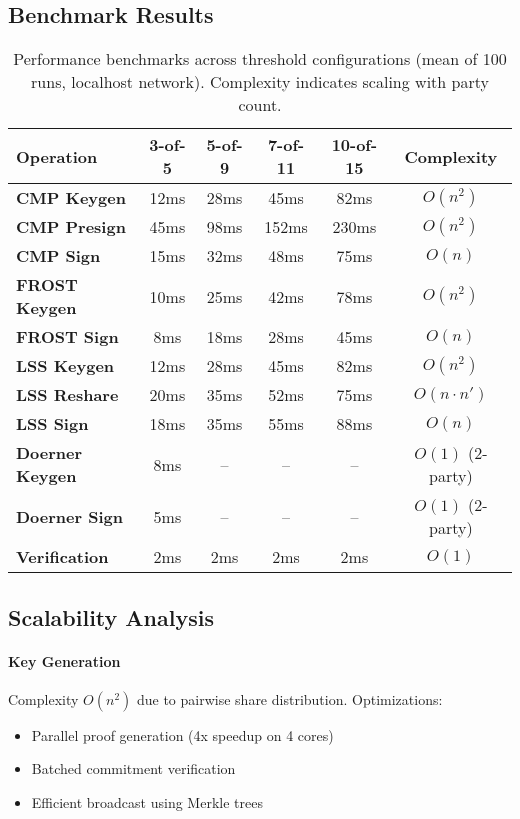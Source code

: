 \documentclass[11pt,twocolumn]{article}
\begin{document}
\subsection{Benchmark Results}

\begin{table*}[t]
\centering
\begin{tabular}{@{}lccccc@{}}
\toprule
\textbf{Operation} & \textbf{3-of-5} & \textbf{5-of-9} & \textbf{7-of-11} & \textbf{10-of-15} & \textbf{Complexity} \\
\midrule
\textbf{CMP Keygen} & 12ms & 28ms & 45ms & 82ms & $O(n^2)$ \\
\textbf{CMP Presign} & 45ms & 98ms & 152ms & 230ms & $O(n^2)$ \\
\textbf{CMP Sign} & 15ms & 32ms & 48ms & 75ms & $O(n)$ \\
\midrule
\textbf{FROST Keygen} & 10ms & 25ms & 42ms & 78ms & $O(n^2)$ \\
\textbf{FROST Sign} & 8ms & 18ms & 28ms & 45ms & $O(n)$ \\
\midrule
\textbf{LSS Keygen} & 12ms & 28ms & 45ms & 82ms & $O(n^2)$ \\
\textbf{LSS Reshare} & 20ms & 35ms & 52ms & 75ms & $O(n \cdot n')$ \\
\textbf{LSS Sign} & 18ms & 35ms & 55ms & 88ms & $O(n)$ \\
\midrule
\textbf{Doerner Keygen} & 8ms & -- & -- & -- & $O(1)$ (2-party) \\
\textbf{Doerner Sign} & 5ms & -- & -- & -- & $O(1)$ (2-party) \\
\midrule
\textbf{Verification} & 2ms & 2ms & 2ms & 2ms & $O(1)$ \\
\bottomrule
\end{tabular}
\caption{Performance benchmarks across threshold configurations (mean of 100 runs, localhost network). Complexity indicates scaling with party count.}
\label{tab:benchmarks}
\end{table*}

\subsection{Scalability Analysis}

\paragraph{Key Generation} Complexity $O(n^2)$ due to pairwise share distribution. Optimizations:
\begin{itemize}
\item Parallel proof generation (4x speedup on 4 cores)
\item Batched commitment verification
\item Efficient broadcast using Merkle trees
\end{itemize}
\end{document}

